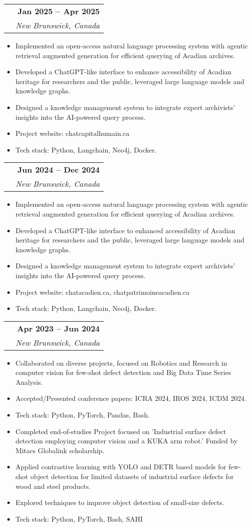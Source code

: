 \documentclass[letterpaper,11pt]{article}
\makeatletter
\newcommand{\resumeItem}[1]{
  \item\small{
    {#1 \vspace{-2pt}}
  }
}
\newcommand{\resumeExperienceSubheading}[4]{
  \vspace{-2pt}\item
    \begin{tabular*}{1.0\textwidth}[t]{@{}p{0.72\textwidth}@{\extracolsep{\fill}}r@{}}
      \textbf{\raggedright #3} & \textbf{\small #2} \\
      \textit{\small\raggedright #1} & \textit{\small #4} \\
    \end{tabular*}\vspace{-7pt}
}
\newcommand{\resumeItemListStart}{\begin{itemize}[label=\textbullet, itemsep=0.2em, topsep=0.2em, parsep=2pt]}
\newcommand{\resumeItemListEnd}{\end{itemize}\vspace{-4pt}}
\makeatother
\begin{document}
\resumeExperienceSubheading
{CFRIA, University of Moncton}{Jan 2025 -- Apr 2025}
{Research Assistant}{New Brunswick, Canada}
\resumeItemListStart
\resumeItem{Implemented an open-access natural language processing system with agentic retrieval augmented generation for efficient querying of Acadian archives.}
\resumeItem{Developed a ChatGPT-like interface to enhance accessibility of Acadian heritage for researchers and the public, leveraged large language models and knowledge graphs.}
\resumeItem{Designed a knowledge management system to integrate expert archivists' insights into the AI-powered query process.}
\resumeItem{Project website: chatcapitalhumain.ca}
\resumeItem{Tech stack: Python, Langchain, Neo4j, Docker.}
\resumeItemListEnd


\resumeExperienceSubheading
{Centre d'études acadiennes Anselme-Chiasson (CEAAC)}{Jun 2024 -- Dec 2024}
{Research Assistant}{New Brunswick, Canada}
\resumeItemListStart
\resumeItem{Implemented an open-access natural language processing system with agentic retrieval augmented generation for efficient querying of Acadian archives.}
\resumeItem{Developed a ChatGPT-like interface to enhanced accessibility of Acadian heritage for researchers and the public, leveraged large language models and knowledge graphs.}
\resumeItem{Designed a knowledge management system to integrate expert archivists' insights into the AI-powered query process.}
\resumeItem{Project website: chatacadien.ca, chatpatrimoineacadien.ca}
\resumeItem{Tech stack: Python, Langchain, Neo4j, Docker.}
\resumeItemListEnd


\resumeExperienceSubheading
{CFRIA, University of Moncton}{Apr 2023 -- Jun 2024}
{Research Assistant}{New Brunswick, Canada}
\resumeItemListStart
\resumeItem{Collaborated on diverse projects, focused on Robotics and Research in computer vision for few-shot defect detection and Big Data Time Series Analysis.}
\resumeItem{Accepted/Presented conference papers: ICRA 2024, IROS 2024, ICDM 2024.}
\resumeItem{Tech stack: Python, PyTorch, Pandas, Bash.}
\resumeItem{Completed end-of-studies Project focused on 'Industrial surface defect detection employing computer vision and a KUKA arm robot.' Funded by Mitacs Globalink scholarship.}
\resumeItem{Applied contrastive learning with YOLO and DETR based models for few-shot object detection for limited datasets of industrial surface defects for wood and steel products.}
\resumeItem{Explored techniques to improve object detection of small-size defects.}
\resumeItem{Tech stack: Python, PyTorch, Bash, SAHI}
\resumeItemListEnd
\end{document}

